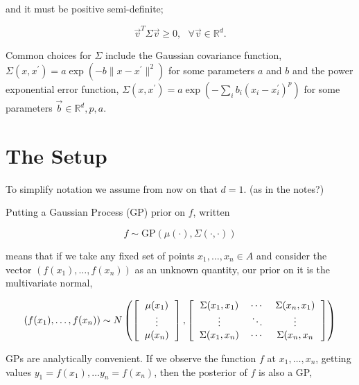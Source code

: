 \documentclass[phd,tocprelim]{cornell}
\begin{document}
and it must be positive semi-definite;

\begin{equation}\vec{v}^{T}\Sigma \vec{v} \geq 0, \ \ \ \forall \vec{v} \in \mathbb{R}^{d}.\end{equation}

Common choices for $\Sigma$ include the Gaussian covariance function, $\Sigma(x,x^{\prime}) = a \exp(-b \| x - x^{\prime}\|^{2})$ for some parameters $a$ and $b$ and the power exponential error function, $\Sigma(x, x^{\prime}) = a \exp(-\sum_{i} b_{i} (x_{i} - x_{i}^{\prime})^{p})$ for some parameters $\vec{b} \in \mathbb{R}^{d}, p, a$.

\section{The Setup}

To simplify notation we assume from now on that $d = 1$. (as in the notes?)

Putting a Gaussian Process (GP) prior on $f$, written

\begin{equation}
 f \sim \mbox{GP}(\mu(\cdot), \Sigma(\cdot, \cdot))
\end{equation}

means that if we take any fixed set of points $x_{1}, \ldots, x_{n} \in A$ and consider the vector $(f(x_{1}), \ldots, f(x_{n}))$ as an unknown quantity, our prior on it is the multivariate normal,

\begin{equation}
(f(x_{1}), \ldots, f(x_{n})) \sim N\left( \left[ \begin{tabular}{c} $\mu(x_{1})$ \\ $\vdots$ \\ $\mu(x_{n})$ \end{tabular} \right] , \left[ \begin{tabular}{ccc} $\Sigma(x_{1}, x_{1})$ & $\cdots$ & $\Sigma(x_{n}, x_{1})$ \\ $\vdots$ & $\ddots$ & $\vdots$ \\ $\Sigma(x_{1}, x_{n})$ & $\cdots$ & $\Sigma(x_{n},x_{n}$ \end{tabular} \right] \right)
\end{equation}

GPs are analytically convenient. If we observe the function $f$ at $x_{1}, \ldots, x_{n}$, getting values $y_{1} = f(x_{1}), \ldots y_{n} = f(x_{n})$, then the posterior of $f$ is also a GP,
\end{document}
